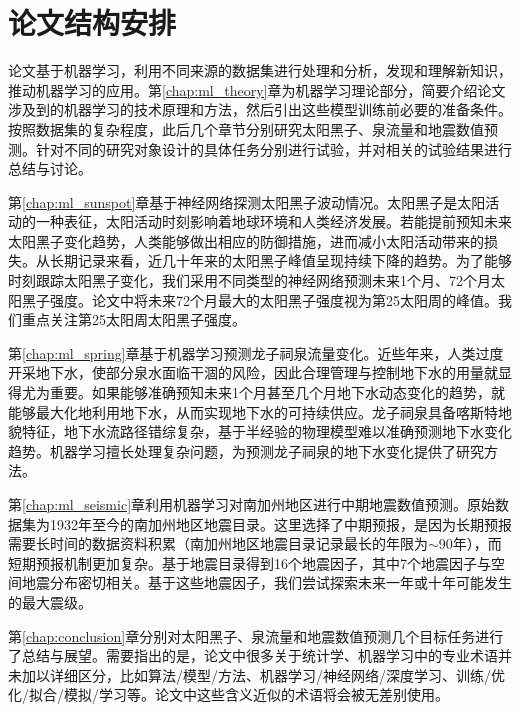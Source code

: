 \section{论文结构安排}\label{sec:intro_strcture}

论文基于机器学习，利用不同来源的数据集进行处理和分析，发现和理解新知识，推动机器学习的应用。第\ref{chap:ml_theory}章为机器学习理论部分，简要介绍论文涉及到的机器学习的技术原理和方法，然后引出这些模型训练前必要的准备条件。按照数据集的复杂程度，此后几个章节分别研究太阳黑子、泉流量和地震数值预测。针对不同的研究对象设计的具体任务分别进行试验，并对相关的试验结果进行总结与讨论。

第\ref{chap:ml_sunspot}章基于神经网络探测太阳黑子波动情况。太阳黑子是太阳活动的一种表征，太阳活动时刻影响着地球环境和人类经济发展。若能提前预知未来太阳黑子变化趋势，人类能够做出相应的防御措施，进而减小太阳活动带来的损失。从长期记录来看，近几十年来的太阳黑子峰值呈现持续下降的趋势。为了能够时刻跟踪太阳黑子变化，我们采用不同类型的神经网络预测未来1个月、72个月太阳黑子强度。论文中将未来72个月最大的太阳黑子强度视为第25太阳周的峰值。我们重点关注第25太阳周太阳黑子强度。

第\ref{chap:ml_spring}章基于机器学习预测龙子祠泉流量变化。近些年来，人类过度开采地下水，使部分泉水面临干涸的风险，因此合理管理与控制地下水的用量就显得尤为重要。如果能够准确预知未来1个月甚至几个月地下水动态变化的趋势，就能够最大化地利用地下水，从而实现地下水的可持续供应。龙子祠泉具备喀斯特地貌特征，地下水流路径错综复杂，基于半经验的物理模型难以准确预测地下水变化趋势。机器学习擅长处理复杂问题，为预测龙子祠泉的地下水变化提供了研究方法。

第\ref{chap:ml_seismic}章利用机器学习对南加州地区进行中期地震数值预测。原始数据集为1932年至今的南加州地区地震目录。这里选择了中期预报，是因为长期预报需要长时间的数据资料积累（南加州地区地震目录记录最长的年限为$\sim$90年），而短期预报机制更加复杂。基于地震目录得到16个地震因子，其中7个地震因子与空间地震分布密切相关。基于这些地震因子，我们尝试探索未来一年或十年可能发生的最大震级。

第\ref{chap:conclusion}章分别对太阳黑子、泉流量和地震数值预测几个目标任务进行了总结与展望。需要指出的是，论文中很多关于统计学、机器学习中的专业术语并未加以详细区分，比如算法/模型/方法、机器学习/神经网络/深度学习、训练/优化/拟合/模拟/学习等。论文中这些含义近似的术语将会被无差别使用。

